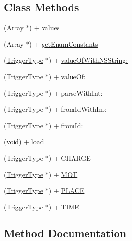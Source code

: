 \subsection*{Class Methods}
\begin{DoxyCompactItemize}
\item 
(Array $\ast$) + \hyperlink{interface_trigger_type_aef3382d342a4c079e8aaf6f453c744c5}{values}
\item 
(Array $\ast$) + \hyperlink{interface_trigger_type_abea5f1953a932700000e49066eb3b76c}{get\+Enum\+Constants}
\item 
(\hyperlink{interface_trigger_type}{Trigger\+Type} $\ast$) + \hyperlink{interface_trigger_type_a22a6a5d30fe1945007e8adc7cb091295}{value\+Of\+With\+N\+S\+String\+:}
\item 
(\hyperlink{interface_trigger_type}{Trigger\+Type} $\ast$) + \hyperlink{interface_trigger_type_a3eb266216366c139184ac6a8e34c1c58}{value\+Of\+:}
\item 
(\hyperlink{interface_trigger_type}{Trigger\+Type} $\ast$) + \hyperlink{interface_trigger_type_a0b207bbda36d0430cee22a933a26177f}{parse\+With\+Int\+:}
\item 
(\hyperlink{interface_trigger_type}{Trigger\+Type} $\ast$) + \hyperlink{interface_trigger_type_a68757941dd60e608cc1297f1cebf1ea1}{from\+Id\+With\+Int\+:}
\item 
(\hyperlink{interface_trigger_type}{Trigger\+Type} $\ast$) + \hyperlink{interface_trigger_type_a90b62d8a456bc8672793590eaafaaae3}{from\+Id\+:}
\item 
(void) + \hyperlink{interface_trigger_type_a0c2788768369e09bdd0e9527a8f7ef79}{load}
\item 
(\hyperlink{interface_trigger_type}{Trigger\+Type} $\ast$) + \hyperlink{interface_trigger_type_a1f67a26cf6a3efcefacc7285cfbbf95b}{C\+H\+A\+R\+G\+E}
\item 
(\hyperlink{interface_trigger_type}{Trigger\+Type} $\ast$) + \hyperlink{interface_trigger_type_afd105e4d74878ea5ab6dd2e9e4897b56}{M\+O\+T}
\item 
(\hyperlink{interface_trigger_type}{Trigger\+Type} $\ast$) + \hyperlink{interface_trigger_type_a999c4dea2199d282b9e8b44e362e2c31}{P\+L\+A\+C\+E}
\item 
(\hyperlink{interface_trigger_type}{Trigger\+Type} $\ast$) + \hyperlink{interface_trigger_type_a73f654022f39bccae9430fa9b48e1ee7}{T\+I\+M\+E}
\end{DoxyCompactItemize}


\subsection{Method Documentation}
\hypertarget{interface_trigger_type_a1f67a26cf6a3efcefacc7285cfbbf95b}{}
